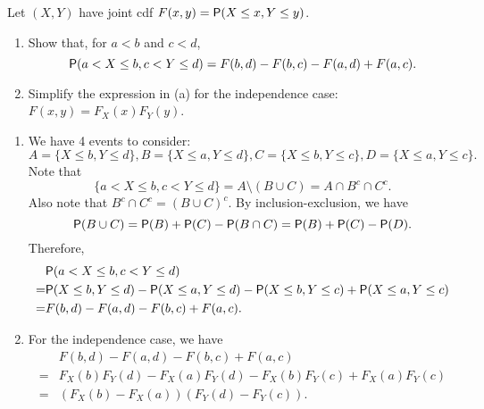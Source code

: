 \documentclass[12pt]{article}
\newcommand{\Prob}{{\sf P}}
\newenvironment{problem}[2][Problem]{\begin{trivlist}
\item[\hskip \labelsep {\bfseries #1}\hskip \labelsep {\bfseries #2.}]}
{\end{trivlist}}
\begin{document}
\begin{problem}{2}
  Let $(X, Y)$ have joint cdf $F (x, y) = \Prob(X \le x, Y \le y)$.
  \begin{enumerate}
    \item Show that, for $a < b$ and $c < d$,
      \[
        \Prob(a < X \le b, c < Y \le d) 
        = F (b, d) - F (b, c) - F (a, d) + F (a, c).
      \]
    \item Simplify the expression in (a) for the independence case: 
    $F (x, y) = F_X (x)F_Y (y)$.
  \end{enumerate}
  \begin{enumerate}
    \item We have 4 events to consider:
    \[
      A = \{X \le b, Y \le d\}, B = \{X \le a, Y \le d\}, 
      C = \{X \le b, Y \le c\}, D = \{X \le a, Y \le c\}.
    \]
    Note that
    \[
      \{a < X \le b, c < Y \le d\} = A \setminus (B \cup C) 
      = A \cap B^c \cap C^c.
    \]
    Also note that $B^c \cap C^c = (B \cup C)^c$. 
    By inclusion-exclusion, we have
    \[
      \Prob(B \cup C) = \Prob(B) + \Prob(C) - \Prob(B \cap C) 
      = \Prob(B) + \Prob(C) - \Prob(D).
    \]
    Therefore,
    \begin{align*}
      &\Prob(a < X \le b, c < Y \le d) \\
      =& \Prob(X \le b, Y \le d) - \Prob(X \le a, Y \le d) 
      - \Prob(X \le b, Y \le c) + \Prob(X \le a, Y \le c) \\
      =& F (b, d) - F (a, d) - F (b, c) + F (a, c).
    \end{align*}
    \item For the independence case, we have
    \begin{align*}
       & F (b, d) - F (a, d) - F (b, c) + F (a, c) \\
      =& F_X (b)F_Y (d) - F_X (a)F_Y (d) 
      - F_X (b)F_Y (c) + F_X (a)F_Y (c) \\
      =& (F_X (b) - F_X (a))(F_Y (d) - F_Y (c)).
    \end{align*}
  \end{enumerate}
\end{problem}

\pagebreak
\end{document}
